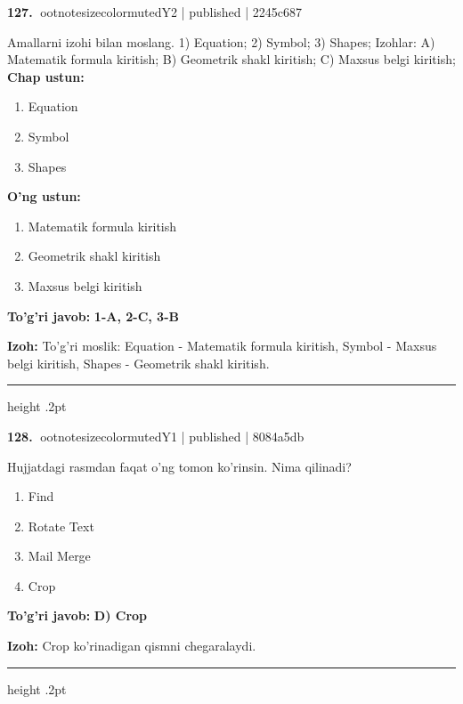 \documentclass[10pt,a4paper]{article}
\begin{document}
\textbf{\color{ink}127.} {ootnotesizecolor{muted}Y2 | published | 2245c687}
\par
Amallarni izohi bilan moslang.  1) Equation;  2) Symbol;  3) Shapes;  Izohlar: A) Matematik formula kiritish;  B) Geometrik shakl kiritish;  C) Maxsus belgi kiritish;
\textbf{Chap ustun:}\begin{enumerate}[label=\arabic*),leftmargin=9mm]
\item Equation
\item Symbol
\item Shapes
\end{enumerate}
\textbf{O'ng ustun:}\begin{enumerate}[label=\Alph*),leftmargin=9mm]
\item Matematik formula kiritish
\item Geometrik shakl kiritish
\item Maxsus belgi kiritish
\end{enumerate}
\begin{tcolorbox}[enhanced,breakable,colback=teal!4,colframe=teal!55!black,boxrule=0.45pt,arc=1.2mm,left=2.8mm,right=2.8mm,top=2mm,bottom=2mm]
\textbf{\color{teal}To'g'ri javob:} \textbf{1-A, 2-C, 3-B}
\par\smallskip
\textbf{Izoh:} To'g'ri moslik: Equation - Matematik formula kiritish, Symbol - Maxsus belgi kiritish, Shapes - Geometrik shakl kiritish.
\end{tcolorbox}
\vspace{2mm}\hrule height .2pt\vspace{2mm}

\textbf{\color{ink}128.} {ootnotesizecolor{muted}Y1 | published | 8084a5db}
\par
Hujjatdagi rasmdan faqat o'ng tomon ko'rinsin. Nima qilinadi?
\begin{enumerate}[label=\Alph*),leftmargin=9mm]
\item Find
\item Rotate Text
\item Mail Merge
\item Crop
\end{enumerate}
\begin{tcolorbox}[enhanced,breakable,colback=teal!4,colframe=teal!55!black,boxrule=0.45pt,arc=1.2mm,left=2.8mm,right=2.8mm,top=2mm,bottom=2mm]
\textbf{\color{teal}To'g'ri javob:} \textbf{D) Crop}
\par\smallskip
\textbf{Izoh:} Crop ko'rinadigan qismni chegaralaydi.
\end{tcolorbox}
\vspace{2mm}\hrule height .2pt\vspace{2mm}
\end{document}
